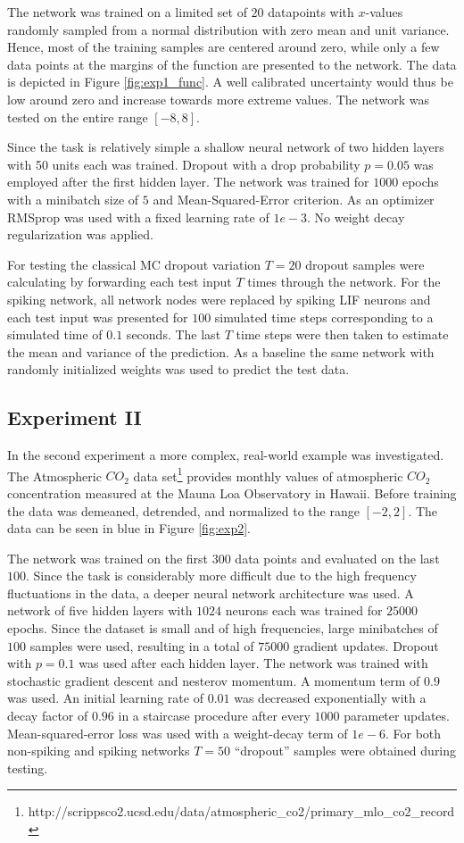 \documentclass[10pt,a4paper,twocolumn]{article}
\begin{document}
The network was trained on a limited set of $20$ datapoints with $x$-values randomly sampled from a  normal distribution with zero mean and unit variance. Hence, most of the training samples are centered around zero, while only a few data points at the margins of the function are presented to the network. The data is depicted in Figure \ref{fig:exp1_func}. A well calibrated uncertainty would thus be low around zero and increase towards more extreme values. The network was tested on the entire range $[-8,8]$.

Since the task is relatively simple a shallow neural network of two hidden layers with 50 units each was trained. Dropout with a drop probability $p=0.05$ was employed after the first hidden layer. The network was trained for $1000$ epochs with a minibatch size of $5$ and Mean-Squared-Error criterion. As an optimizer RMSprop \cite{tieleman2012rmsprop} was used with a fixed learning rate of $1e-3$. No weight decay regularization was applied.

For testing the classical MC dropout variation $T=20$ dropout samples were calculating by forwarding each test input $T$ times through the network. For the spiking network, all network nodes were replaced by spiking LIF neurons and each test input was presented for $100$ simulated time steps corresponding to a simulated time of $0.1$ seconds. The last $T$ time steps were then taken to estimate the mean and variance of the prediction. As a baseline the same network with randomly initialized weights was used to predict the test data. 

\subsection{Experiment II}

In the second experiment a more complex, real-world example was investigated. The Atmospheric $CO_2$ data set\footnote{http://scrippsco2.ucsd.edu/data/atmospheric\_co2/primary\_mlo\_co2\_record} provides monthly values of atmospheric $CO_2$ concentration measured at the Mauna Loa Observatory in Hawaii.
Before training the data was demeaned, detrended, and normalized to the range $[-2,2]$. The data can be seen in blue in Figure \ref{fig:exp2}.

The network was trained on the first $300$ data points and evaluated on the last $100$. Since the task is considerably more difficult due to the high frequency fluctuations in the data, a deeper neural network architecture was used. A network of five hidden layers with $1024$ neurons each was trained for $25000$ epochs. Since the dataset is small and of high frequencies, large minibatches of $100$ samples were used, resulting in a total of $75000$ gradient updates. Dropout with $p=0.1$ was used after each hidden layer. The network was trained with stochastic gradient descent and nesterov momentum. A momentum term of $0.9$ was used. An initial learning rate of $0.01$ was decreased exponentially with a decay factor of $0.96$ in a staircase procedure after every $1000$ parameter updates. Mean-squared-error loss was used with a weight-decay term of $1e-6$. For both non-spiking and spiking networks $T=50$ ``dropout'' samples were obtained during testing.
\end{document}
